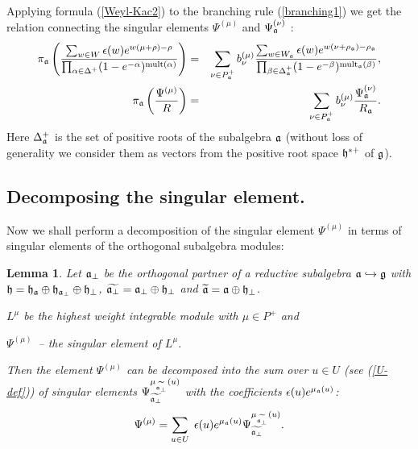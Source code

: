 \documentclass[12pt]{article}
\newtheorem{lemma}{Lemma}
\theoremstyle{definition}
\begin{document}
Applying formula (\ref{Weyl-Kac2}) to the branching rule (\ref{branching1})
we get the relation connecting the singular elements $\Psi ^{\left( \mu
\right) }$ and $\Psi _{\frak{a}}^{\left( \nu \right) }$ : 
\begin{eqnarray}
\pi _{\frak{a}}\left( \frac{\sum_{w \in W}\epsilon (w )e^{w (\mu +\rho
)-\rho }}{\prod_{\alpha \in \Delta ^{+}}(1-e^{-\alpha })^{\mathrm{mult}%
(\alpha )}}\right) &=&\sum_{\nu \in P_{\frak{a}}^{+}}b_{\nu }^{(\mu )}\frac{%
\sum_{w \in W_{\frak{a}}}\epsilon (w )e^{w (\nu +\rho _{\frak{a}})-\rho _{%
\frak{a}}}}{\prod_{\beta \in \Delta _{\frak{a}}^{+}}(1-e^{-\beta })^{\mathrm{%
mult}_{\frak{a}}(\beta )}},  \nonumber  \label{eq:4} \\
\pi _{\frak{a}}\left( \frac{\Psi ^{\left( \mu \right) }}{R}\right)
&=&\sum_{\nu \in P_{\frak{a}}^{+}}b_{\nu }^{(\mu )}\frac{\Psi _{\frak{a}%
}^{\left( \nu \right) }}{R_{\frak{a}}}.
\end{eqnarray}
Here $\Delta _{\frak{a}}^{+}$ is the set of positive roots of the subalgebra 
$\frak{a}$ (without loss of generality we consider them as vectors from the
positive root space $\frak{h}^{\ast +}$ of $\frak{g}$).

\subsection{Decomposing the singular element.}

\label{subsec:decomp-sing-element}

Now we shall perform a decomposition of the singular element $\Psi ^{\left(
\mu \right) }$ in terms of singular elements of the orthogonal subalgebra
modules:

\begin{lemma}
Let $\frak{a}_{\bot }$ be the orthogonal partner of a reductive subalgebra $%
\frak{a}\hookrightarrow \frak{g}$ with $\frak{h}=\frak{\frak{h}_{\frak{a}}}%
\oplus \frak{h}_{\frak{a}_{\perp }}\oplus \frak{h}_{\perp }$, $\widetilde{%
\frak{a}_{\perp }}=\frak{a}_{\perp }\oplus \frak{h}_{\perp }$ and $%
\widetilde{\frak{a}}=\frak{a}\oplus \frak{h}_{\perp }$.

$L^{\mu }$ be the highest weight integrable module with $\mu \in P^{+}$ and

$\Psi ^{\left( \mu \right) }$\ -- the singular element of $L^{\mu }$.

Then the element $\Psi ^{\left( \mu \right) }$ can be decomposed into the
sum over $u\in U$ (see (\ref{U-def})) of singular elements $\Psi _{%
\widetilde{\frak{a}_{\perp }}}^{\mu _{\widetilde{\frak{a}_{\perp }}}\left(
u\right) }$ with the coefficients $\epsilon (u)e^{\mu _{\frak{a}}\left(
u\right) }$:
\begin{equation}
\Psi ^{\left( \mu \right) }=\sum_{u\in U}\;\epsilon (u)e^{\mu _{\frak{a}%
}\left( u\right) }\Psi _{\widetilde{\frak{a}_{\perp }}}^{\mu _{\widetilde{%
\frak{a}_{\perp }}}\left( u\right) }.  \label{sing decomp main}
\end{equation}
\end{lemma}
\end{document}
